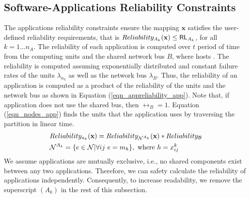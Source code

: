 \subsection{Software-Applications Reliability Constraints}\label{subsec_reliability_constraint}
The applications reliability constraints ensure the mapping $\textbf{x}$ satisfies the user-defined reliability requirements, that is $Reliability_{A_k}(\textbf{x})\leq \mathsf{RL}_{A_k}$, for all $k=1...n_A$. 
The reliability of each application is computed over $t$ period of time from the computing units  and  the shared network bus $B$, where  hosts \ttar. The reliability is computed assuming exponentially distributed and constant failure rates of the units $\lambda_{n_h}$ as well as the network bus $\lambda_B$. Thus, the reliability of an application is computed as a product of the reliability of the units and the network bus as shown in Equation (\ref{eqn_appreliability_app}). Note that, if application does not use the shared bus, then $\rel_{B}=1$. Equation (\ref{eqn_nodes_app}) finds the units  that the application \ttar uses by traversing the partition \ttx in linear time.
\begin{align}
\label{eqn_appreliability_app}
&Reliability_{\ar}(\x)=Reliability_{\ssp{\nodes}}(\x)*Reliability_\bus\\
\label{eqn_nodes_app}
&\ssp{\nodes}=\{e\in \nodes| \forall ij\ e=m_h\},\mbox{ where } h=\ssx{k}{ij}
\end{align}
We assume applications are mutually exclusive, i.e., no shared components exist between any two applications. Therefore, we can safety calculate the reliability of applications independently. Consequently, to increase readability, we remove the superscript $(A_k)$ in the rest of this subsection.


